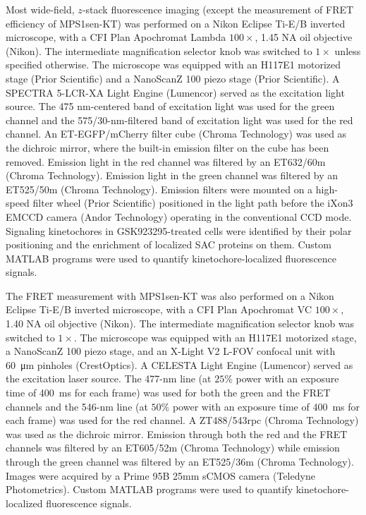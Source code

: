 Most wide-field, $z$-stack fluorescence imaging (except the measurement of FRET efficiency of MPS1sen-KT) was performed on a Nikon Eclipse Ti-E/B inverted microscope, with a CFI Plan Apochromat Lambda $100\times$, 1.45 NA oil objective (Nikon). The intermediate magnification selector knob was switched to $1\times$ unless specified otherwise. The microscope was equipped with an H117E1 motorized stage (Prior Scientific) and a NanoScanZ 100 piezo stage (Prior Scientific). A SPECTRA 5-LCR-XA Light Engine (Lumencor) served as the excitation light source. The 475 nm-centered band of excitation light was used for the green channel and the 575/30-nm-filtered band of excitation light was used for the red channel. An ET-EGFP/mCherry filter cube (Chroma Technology) was used as the dichroic mirror, where the built-in emission filter on the cube has been removed. Emission light in the red channel was filtered by an ET632/60m (Chroma Technology). Emission light in the green channel was filtered by an ET525/50m (Chroma Technology). Emission filters were mounted on a high-speed filter wheel (Prior Scientific) positioned in the light path before the iXon3 EMCCD camera (Andor Technology) operating in the conventional CCD mode. Signaling kinetochores in GSK923295-treated cells were identified by their polar positioning and the enrichment of localized SAC proteins on them. Custom MATLAB programs \cite{HeLaFRETGUI} were used to quantify kinetochore-localized fluorescence signals.

The FRET measurement with MPS1sen-KT was also performed on a Nikon Eclipse Ti-E/B inverted microscope, with a CFI Plan Apochromat VC $100\times$, 1.40 NA oil objective (Nikon). The intermediate magnification selector knob was switched to $1\times$. The microscope was equipped with an H117E1 motorized stage, a NanoScanZ 100 piezo stage, and an X-Light V2 L-FOV confocal unit with \SI{60}{\micro m} pinholes (CrestOptics). A CELESTA Light Engine (Lumencor) served as the excitation laser source. The 477-nm line (at $25\%$ power with an exposure time of \SI{400}{ms} for each frame) was used for both the green and the FRET channels and the 546-nm line (at $50\%$ power with an exposure time of \SI{400}{ms} for each frame) was used for the red channel. A ZT488/543rpc (Chroma Technology) was used as the dichroic mirror. Emission through both the red and the FRET channels was filtered by an ET605/52m (Chroma Technology) while emission through the green channel was filtered by an ET525/36m (Chroma Technology). Images were acquired by a Prime 95B 25mm sCMOS camera (Teledyne Photometrics). Custom MATLAB programs \cite{HeLaFRETGUI} were used to quantify kinetochore-localized fluorescence signals.

